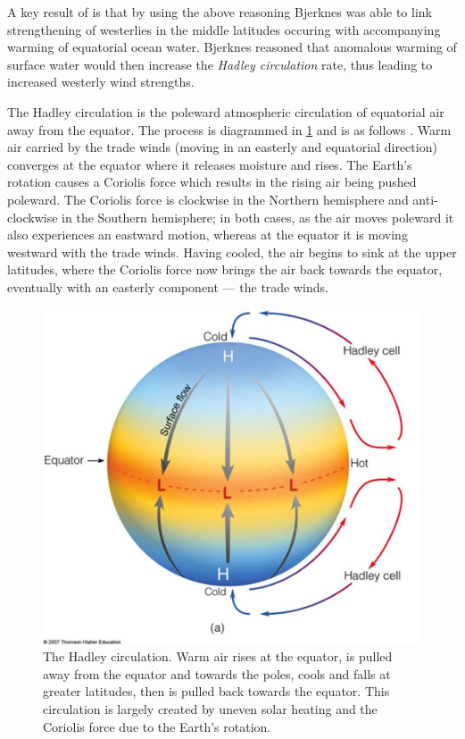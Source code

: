 A key result of \citep{bjerknes1966} is that by using the above reasoning
Bjerknes was able to link strengthening of westerlies in the middle latitudes
occuring with accompanying warming of equatorial ocean water. Bjerknes reasoned
that anomalous warming of surface water would then increase the \emph{Hadley
  circulation} rate, thus leading to increased westerly wind strengths.

The Hadley circulation is the poleward atmospheric circulation of
equatorial air away from the equator. The process is diagrammed in
\ref{fig:hadleycell} and is as follows \citep{geomar6557}. Warm air carried by
the trade winds (moving in an easterly and equatorial direction) converges at
the equator where it releases moisture and rises. The Earth's rotation causes a
Coriolis force which results in the rising air being pushed poleward. The
Coriolis force is clockwise in the Northern hemisphere and anti-clockwise in the
Southern hemisphere; in both cases, as the air moves poleward it also
experiences an eastward motion, whereas at the equator it is moving westward
with the trade winds. Having cooled, the air begins to sink at the upper
latitudes, where the Coriolis force now brings the air back towards the equator,
eventually with an easterly component --- the trade winds.

\begin{figure}[t]
  \centering \includegraphics[width=0.9\linewidth]{figures/hadleycell.png}
  \caption{The Hadley circulation. Warm air rises at the equator, is pulled away
    from the equator and towards the poles, cools and falls at greater
    latitudes, then is pulled back towards the equator. This circulation is
    largely created by uneven solar heating and the Coriolis force due to the
    Earth's rotation.}
  \label{fig:hadleycell}
\end{figure}

